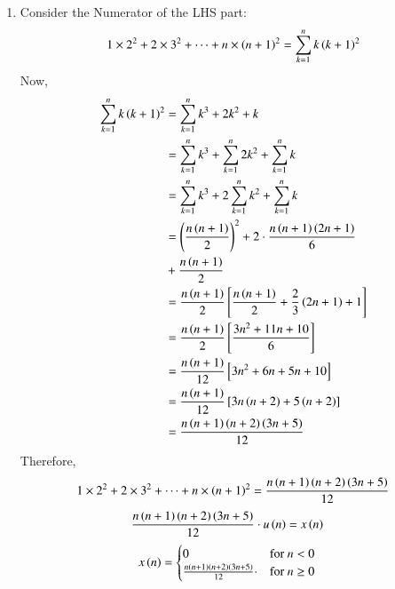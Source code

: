 \documentclass[journal,12pt,twocolumn]{IEEEtran}
\theoremstyle{remark}
\begin{document}
\begin{enumerate}
\item Consider the Numerator of the LHS part:
\begin{equation}
    1\times2^2 + 2\times3^2 + \dots + n\times\left(n+1\right)^2 = \sum_{k=1}^n k\left(k+1\right)^2 
\end{equation}
Now,
\begin{align}
    \sum_{k=1}^n k\left(k+1\right)^2 &= \sum_{k=1}^n k^3+2k^2+k\\
                          &=  \sum_{k=1}^n k^3 + \sum_{k=1}^n 2k^2 + \sum_{k=1}^n k\\
                          &=  \sum_{k=1}^n k^3 + 2\sum_{k=1}^n k^2 + \sum_{k=1}^n k\\
                          &= \left(\frac{n\left(n+1\right)}{2}\right)^{\scriptstyle 2} + 2\cdot \frac{n\left(n+1\right)\left(2n+1\right)}{6}\\  &+\frac{n\left(n+1\right)}{2}\notag \\
                          &= \frac{n\left(n+1\right)}{2}\left[\frac{n\left(n+1\right)}{2} + \frac{2}{3}\left(2n+1\right) + 1\right]\\
                          &= \frac{n\left(n+1\right)}{2}\left[\frac{3n^2 + 11n +10}{6}\right]\\
                          &= \frac{n\left(n+1\right)}{12}\left[3n^2 + 6n + 5n + 10\right]\\
                          &= \frac{n\left(n+1\right)}{12}\left[3n\left(n+2\right)+5\left(n+2\right)\right]\\
                          &= \frac{n\left(n+1\right)\left(n+2\right)\left(3n+5\right)}{12}
\end{align}
Therefore,
\begin{equation}
   1\times2^2 + 2\times3^2 + \dots + n\times\left(n+1\right)^2 = \frac{n\left(n+1\right)\left(n+2\right)\left(3n+5\right)}{12}   \\
\end{equation}
\begin{align}
    \frac{n\left(n+1\right)\left(n+2\right)\left(3n+5\right)}{12}\cdot u\left(n\right) &= x\left(n\right)
    \end{align}
\begin{align}
     x\left(n\right) & = \begin{cases}
        0 & \text{for } n < 0 \\
        \frac{n\left(n+1\right)\left(n+2\right)\left(3n+5\right)}{12}\cdot& \text{for } n \geq 0
    \end{cases}
\end{align}
\begin{figure}[h]
    \hspace{1cm}

\end{figure}
\end{enumerate}
\end{document}
